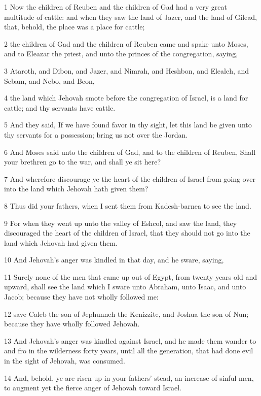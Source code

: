 \par 1 Now the children of Reuben and the children of Gad had a very great multitude of cattle: and when they saw the land of Jazer, and the land of Gilead, that, behold, the place was a place for cattle;
\par 2 the children of Gad and the children of Reuben came and spake unto Moses, and to Eleazar the priest, and unto the princes of the congregation, saying,
\par 3 Ataroth, and Dibon, and Jazer, and Nimrah, and Heshbon, and Elealeh, and Sebam, and Nebo, and Beon,
\par 4 the land which Jehovah smote before the congregation of Israel, is a land for cattle; and thy servants have cattle.
\par 5 And they said, If we have found favor in thy sight, let this land be given unto thy servants for a possession; bring us not over the Jordan.
\par 6 And Moses said unto the children of Gad, and to the children of Reuben, Shall your brethren go to the war, and shall ye sit here?
\par 7 And wherefore discourage ye the heart of the children of Israel from going over into the land which Jehovah hath given them?
\par 8 Thus did your fathers, when I sent them from Kadesh-barnea to see the land.
\par 9 For when they went up unto the valley of Eshcol, and saw the land, they discouraged the heart of the children of Israel, that they should not go into the land which Jehovah had given them.
\par 10 And Jehovah's anger was kindled in that day, and he sware, saying,
\par 11 Surely none of the men that came up out of Egypt, from twenty years old and upward, shall see the land which I sware unto Abraham, unto Isaac, and unto Jacob; because they have not wholly followed me:
\par 12 save Caleb the son of Jephunneh the Kenizzite, and Joshua the son of Nun; because they have wholly followed Jehovah.
\par 13 And Jehovah's anger was kindled against Israel, and he made them wander to and fro in the wilderness forty years, until all the generation, that had done evil in the sight of Jehovah, was consumed.
\par 14 And, behold, ye are risen up in your fathers' stead, an increase of sinful men, to augment yet the fierce anger of Jehovah toward Israel.

